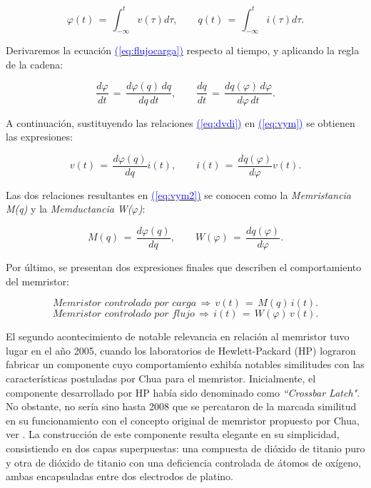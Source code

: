 \documentclass[12pt,a4paper]{report} %
\newcommand{\eref}[1]{\hyperref[#1]{\textcolor{blue}{(\ref*{#1})}}}
\newcommand{\eref}[1]{\hyperref[#1]{\textcolor{blue}{\textit{(\ref*{#1})}}}}
\begin{document}
	\begin{equation}
		\varphi(t)\,=\,\int_{-\infty}^{t}v(\tau)d\tau, \qquad q(t)\,=\,\int_{-\infty}^{t}i(\tau)d\tau.
		\label{eq:flujocargaintegral}
	\end{equation}\smallskip
	
	\noindent Derivaremos la ecuación \eref{eq:flujocarga} respecto al tiempo, y aplicando la regla de la cadena:
	
	\begin{equation}
		\frac{d\varphi}{dt}\,=\,\frac{d\varphi(q)\,dq}{dq\,dt}, \qquad \frac{dq}{dt}\,=\,\frac{dq(\varphi)\,d\varphi}{d\varphi\,dt}.
		\label{eq:vym}
	\end{equation}\smallskip
	
	\noindent A continuación, sustituyendo las relaciones \eref{eq:dvdi} en \eref{eq:vym} se obtienen las expresiones:
	
	\begin{equation}
		v(t)\,=\,\frac{d\varphi(q)}{dq}i(t), \qquad i(t)\,=\,\frac{dq(\varphi)}{d\varphi}v(t).
		\label{eq:vym2}
	\end{equation}\smallskip
	
	\noindent Las dos relaciones resultantes en \eref{eq:vym2} se conocen como la \textit{Memristancia M(q)} y la \textit{Memductancia W($\varphi$)}:
	
	\begin{equation}
		M(q)\,=\,\frac{d\varphi(q)}{dq}, \qquad W(\varphi)\,=\,\frac{dq(\varphi)}{d\varphi}.
		\label{eq:myw}
	\end{equation}\smallskip
	
	\noindent Por último, se presentan dos expresiones finales que describen el comportamiento del memristor:
	
	\begin{equation}
		\textit{Memristor controlado por carga} \, \Rightarrow \, v(t)\,=\,M(q)\,i(t).
		\label{eq:cc}
	\end{equation}\smallskip
	\begin{equation}
		\textit{Memristor controlado por flujo} \, \Rightarrow \, i(t)\,=\,W(\varphi)\,v(t).
		\label{eq:fc}
	\end{equation}\smallskip
	
	\newpage
	
	 El segundo acontecimiento de notable relevancia en relación al memristor tuvo lugar en el año 2005, cuando los laboratorios de Hewlett-Packard (HP) lograron fabricar un componente cuyo comportamiento exhibía notables similitudes con las características postuladas por Chua para el memristor. Inicialmente, el componente desarrollado por HP había sido denominado como \textit{``Crossbar Latch"}. No obstante, no sería sino hasta 2008 que se percataron de la marcada similitud en su funcionamiento con el concepto original de memristor propuesto por Chua, ver \cite{williams}. La construcción de este componente resulta elegante en su simplicidad, consistiendo en dos capas superpuestas: una compuesta de dióxido de titanio puro y otra de dióxido de titanio con una deficiencia controlada de átomos de oxígeno, ambas encapsuladas entre dos electrodos de platino.
	
\end{document}
